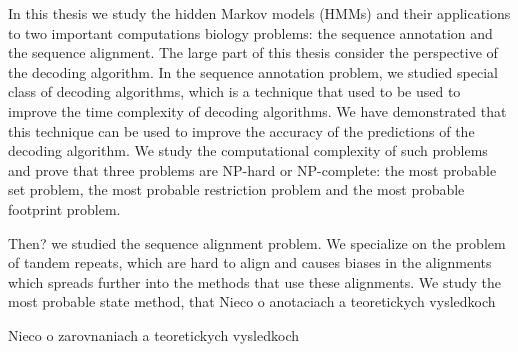 In this thesis we study the hidden Markov models (HMMs) and their applications
to two important computations biology problems: the sequence annotation and the
sequence alignment. The large part of this thesis consider the perspective of
the decoding algorithm. In the sequence annotation problem, we studied special
class of decoding algorithms, which is a technique that used to be used to
improve the time complexity of decoding algorithms. We have demonstrated that
this technique can be used to improve the accuracy of the predictions of the
decoding algorithm. We study the computational complexity of such problems and
prove that three problems are NP-hard or NP-complete: the most probable set
problem, the most probable restriction problem and the most probable footprint
problem.

Then? we studied the sequence alignment problem. We specialize on the problem
of tandem repeats, which are hard to align and causes biases in the alignments
which spreads further into the methods that use these alignments. We study the most probable 
state method, that
Nieco o anotaciach a teoretickych vysledkoch

Nieco o zarovnaniach a teoretickych vysledkoch
